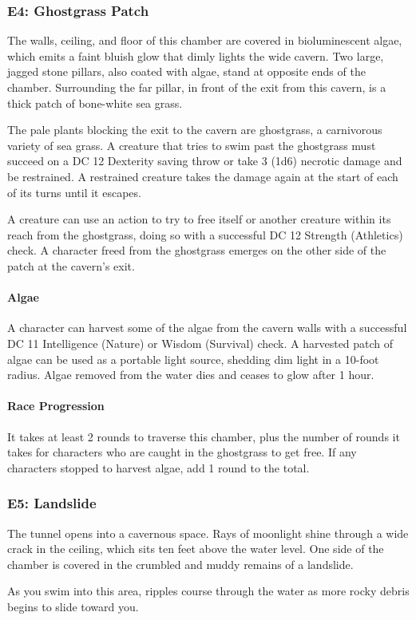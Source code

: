 \documentclass[10pt,a4paper,twoside,twocolumn,openany,nodeprecatedcode]{dndbook}
\begin{document}
\subsubsection{E4: Ghostgrass Patch}
\begin{DndReadAloud}{}
The walls, ceiling, and floor of this chamber are covered in bioluminescent algae, which emits a faint bluish glow that dimly lights the wide cavern. Two large, jagged stone pillars, also coated with algae, stand at opposite ends of the chamber. Surrounding the far pillar, in front of the exit from this cavern, is a thick patch of bone-white sea grass.

\end{DndReadAloud}

The pale plants blocking the exit to the cavern are ghostgrass, a carnivorous variety of sea grass. A creature that tries to swim past the ghostgrass must succeed on a DC 12 Dexterity saving throw or take 3 (1d6) necrotic damage and be restrained. A restrained creature takes the damage again at the start of each of its turns until it escapes.

A creature can use an action to try to free itself or another creature within its reach from the ghostgrass, doing so with a successful DC 12 Strength (Athletics) check. A character freed from the ghostgrass emerges on the other side of the patch at the cavern's exit.

\paragraph{Algae}
A character can harvest some of the algae from the cavern walls with a successful DC 11 Intelligence (Nature) or Wisdom (Survival) check. A harvested patch of algae can be used as a portable light source, shedding dim light in a 10-foot radius. Algae removed from the water dies and ceases to glow after 1 hour.

\paragraph{Race Progression}
It takes at least 2 rounds to traverse this chamber, plus the number of rounds it takes for characters who are caught in the ghostgrass to get free. If any characters stopped to harvest algae, add 1 round to the total.

\subsubsection{E5: Landslide}
\begin{DndReadAloud}{}
The tunnel opens into a cavernous space. Rays of moonlight shine through a wide crack in the ceiling, which sits ten feet above the water level. One side of the chamber is covered in the crumbled and muddy remains of a landslide.

As you swim into this area, ripples course through the water as more rocky debris begins to slide toward you.

\end{DndReadAloud}
\end{document}
